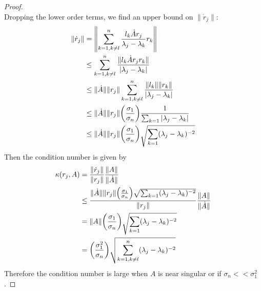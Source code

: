 \documentclass[12pt]{report}
\begin{document}
\begin{problem}
\begin{proof}
\[\]
Dropping the lower order terms, we find an upper bound on $\|\dot{r}_j\|$:
\begin{align*}
    \| \dot{r}_j \| &= \left\| \sum_{k=1,k\neq l}^n \frac{l_k\dot{A}r_j}{\lambda_j - \lambda_k} r_k \right\|\\
    &\leq \sum_{k=1,k\neq l}^n \frac{\| l_k \dot{A} r_j r_k \|}{|\lambda_j - \lambda_k|}\\
    &\leq \|\dot{A}\|\|r_j\| \sum_{k=1,k\neq l}^n \frac{\| l_k \| \| r_k \|}{|\lambda_j - \lambda_k|}\\
    &\leq \|\dot{A}\|\|r_j\| {\left(\frac{\sigma_1}{\sigma_n}\right)} \frac{1}{\sum_{k=1}|\lambda_j - \lambda_k|}\\
    &\leq \|\dot{A}\|\|r_j\| {\left(\frac{\sigma_1}{\sigma_n}\right)} \sqrt{\sum_{k=1}(\lambda_j - \lambda_k)^{-2}}\\
\end{align*}
Then the condition number is given by
\begin{align*}
    \kappa(r_j,A) &= \frac{\|\dot{r}_j\|}{\|r_j\|} \frac{\|A\|}{\|\dot{A}\|}\\
    &\leq \frac{\|\dot{A}\|\|r_j\| {\left(\frac{\sigma_1}{\sigma_n}\right)} \sqrt{\sum_{k=1}(\lambda_j - \lambda_k)^{-2}}}{\|r_j\|} \frac{\|A\|}{\|\dot{A}\|}\\
    &= \|A\|{\left(\frac{\sigma_1}{\sigma_n}\right)} \sqrt{\sum_{k=1}(\lambda_j - \lambda_k)^{-2}}\\
    &= {\left(\frac{\sigma_1^2}{\sigma_n}\right)} \sqrt{\sum_{k=1,k\neq l}^n(\lambda_j - \lambda_k)^{-2}}
\end{align*}
Therefore the condition number is large when $A$ is near singular or if $\sigma_n << \sigma_1^2$.

\end{proof}
\end{problem}




\end{document}
